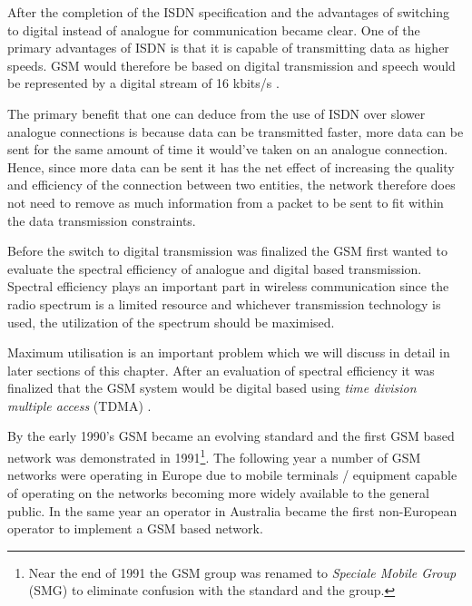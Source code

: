 After the completion of the ISDN specification and the advantages of switching to digital instead of analogue for communication became clear. One of the primary advantages of ISDN is that it is capable of transmitting data as higher speeds. GSM would therefore be based on digital transmission and speech would be represented by a digital stream of 16 kbits/s \cite{GSM92}.

The primary benefit that one can deduce from the use of ISDN over slower analogue connections is because data can be transmitted faster, more data can be sent for the same amount of time it would've taken on an analogue connection. Hence, since more data can be sent it has the net effect of increasing the quality and efficiency of the connection between two entities, the network therefore does not need to remove as much information from a packet to be sent to fit within the data transmission constraints.

Before the switch to digital transmission was finalized the GSM first wanted to evaluate the spectral efficiency of analogue and digital based transmission. Spectral efficiency plays an important part in wireless communication since the radio spectrum is a limited resource and whichever transmission technology is used, the utilization of the spectrum should be maximised. 

Maximum utilisation is an important problem which we will discuss in detail in later sections of this chapter. After an evaluation of spectral efficiency it was finalized that the GSM system would be digital based using \emph{time division multiple access} (TDMA) \cite{GSM92,GSMSysEngin}.

By the early 1990’s GSM became an evolving standard and the first GSM based network was demonstrated in 1991\footnote{Near the end of 1991 the GSM group was renamed to \emph{Speciale Mobile Group} (SMG) to eliminate confusion with the standard and the group.}. The following year a number of GSM networks were operating in Europe due to mobile terminals / equipment capable of operating on the networks becoming more widely available to the general public. In the same year an operator in Australia became the first non-European operator to implement a GSM based network\cite{Eisenblatter}.

